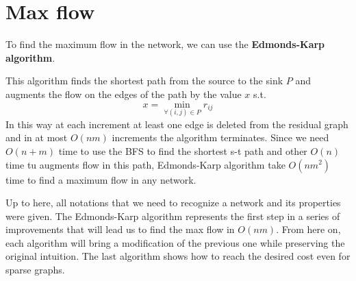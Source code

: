 \section{Max flow}
To find the maximum flow in the network, we can use the \textbf{Edmonds-Karp algorithm}\cite{Edmonds_Karp}.

This algorithm finds the shortest path from the source to the sink $P$ and augments the flow on the edges of the path by the value $x$ s.t.
\[x = \min_{\forall (i,j)\in P} r_{ij}\]
In this way at each increment at least one edge is deleted from the residual graph and in at most $O(nm)$ increments the algorithm terminates.
Since we need $O(n+m)$ time to use the BFS to find the shortest s-t path and other $O(n)$ time tu augments flow in this path, Edmonds-Karp algorithm take $O(nm^2)$ time to find a maximum flow in any network.

Up to here, all notations that we need to recognize a network and its properties were given. The Edmonds-Karp algorithm represents the first step in a series of improvements that will lead us to find the max flow in $O(nm)$. From here on, each algorithm will bring a modification of the previous one while preserving the original intuition. The last algorithm shows how to reach the desired cost even for sparse graphs.

\cleardoublepage
